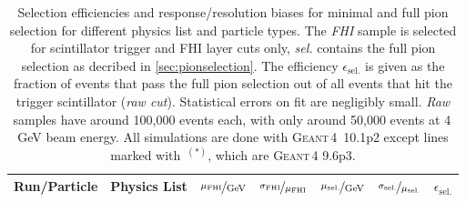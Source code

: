 \documentclass[twoside,a4paper,12pt]{article}
\newcommand\geant{\textsc{Geant\,4}\xspace}
\begin{document}
\begin{appendix}
\begin{table}[htbp]
\begin{center}
\caption{Selection efficiencies and response/resolution biases for minimal and full pion selection for different physics list and particle types. The \emph{FHI} sample is selected for scintillator trigger and FHI layer cuts only, \emph{sel.} contains the full pion selection as decribed in \ref{sec:pionselection}. The efficiency $\epsilon_\text{sel.}$ is given as the fraction of events that pass the full pion selection out of all events that hit the trigger scintillator (\emph{raw cut}). Statistical errors on fit are negligibly small. \emph{Raw} samples have around 100,000 events each, with only around 50,000 events at 4\,GeV beam energy. All simulations are done with \geant\ 10.1p2 except lines marked with\ $^{(\ast)}$, which are \geant 9.6p3. }
\label{table:pionselectionMC}
\begin{tabular}{p{1.8cm}c|l|r|r|r|r|r}
	\multicolumn{2}{c|}{Run/Particle} & \multicolumn{1}{c|}{Physics List} & \multicolumn{1}{c|}{$\nicefrac{\mu_\text{FHI}}{\text{GeV}}$} & \multicolumn{1}{c|}{$\nicefrac{\sigma_\text{FHI}}{\mu_\text{FHI}}$} & \multicolumn{1}{c|}{$\nicefrac{\mu_\text{sel.}}{\text{GeV}}$} & \multicolumn{1}{c|}{$\nicefrac{\sigma_\text{sel.}}{\mu_\text{sel.}}$}  & \multicolumn{1}{c}{$\epsilon_\text{sel.}$} \\\hline
   

\end{tabular}
\end{center}
\end{table}
\end{appendix}
\end{document}
